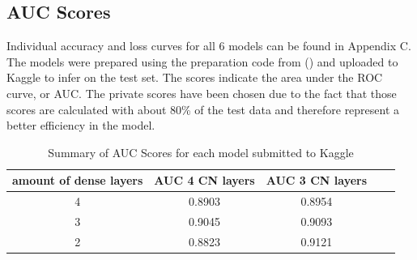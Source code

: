 \subsection{AUC Scores}
Individual accuracy and loss curves for all 6 models can be found in Appendix C. The models were prepared using the preparation code from (\cite{Veto8p361-project-imaging}) and uploaded to Kaggle to infer on the test set. The scores indicate the area under the ROC curve, or AUC. The private scores have been chosen due to the fact that those scores are calculated with about 80\% of the test data and therefore represent a better efficiency in the model.
\begin{table}[h]
\centering
\begin{tabular}[width=0.7\textwidth]{|c|c|c|c|c|}
\hline
\textbf{amount of dense layers} & \textbf{AUC 4 CN layers} & \textbf{AUC 3 CN layers} \\ \hline
4 & 0.8903 & 0.8954\\ \hline
3 & 0.9045 & 0.9093 \\ \hline
2 & 0.8823 & 0.9121\\ \hline
\end{tabular}
\caption{Summary of AUC Scores for each model submitted to Kaggle}
\label{AUC table}
\end{table}

